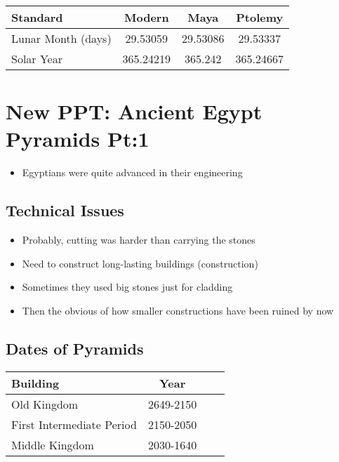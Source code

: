 \documentclass{article}
\begin{document}
\begin{center}
\begin{tabular}{lccc}
\textbf{Standard} & \textbf{Modern} & \textbf{Maya} & \textbf{Ptolemy} \\
\hline
Lunar Month (days) & 29.53059 & 29.53086 & 29.53337 \\
Solar Year & 365.24219 & 365.242 & 365.24667
\end{tabular}
\end{center}

\section{New PPT: Ancient Egypt Pyramids Pt:1}
\begin{itemize}
  \item Egyptians were quite advanced in their engineering
\end{itemize}

\subsection{Technical Issues}
\begin{itemize}
  \item Probably, cutting was harder than carrying the stones
  \item Need to construct long-lasting buildings (construction)
  \item Sometimes they used big stones just for cladding
  \item Then the obvious of how smaller constructions
    have been ruined by now
\end{itemize}

\subsection{Dates of Pyramids}
\begin{center}
\begin{tabular}{lccc}
\textbf{Building} & \textbf{Year} \\
\hline
 Old Kingdom & 2649-2150 \\
 First Intermediate Period & 2150-2050 \\
 Middle Kingdom & 2030-1640 \\
\end{tabular}
\end{center}
\end{document}

